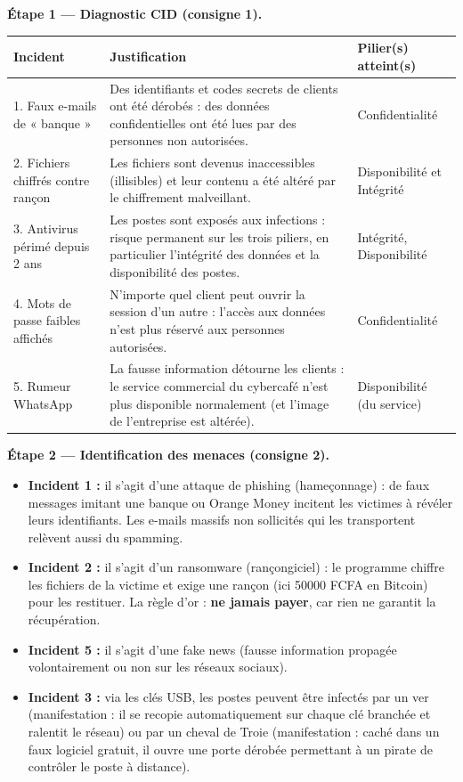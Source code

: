 \documentclass[11pt]{article}
\newcommand{\cle}[1]{{\popxbold\color{popdark}#1}}
\begin{document}
\begin{exoresolu}
\textbf{Étape 1 — Diagnostic CID (consigne 1).}

\begin{center}
\begin{tabularx}{\linewidth}{|l|X|l|}
\hline
\rowcolor{popblueL} \textbf{Incident} & \textbf{Justification} & \textbf{Pilier(s) atteint(s)} \\
\hline
1. Faux e-mails de « banque » & Des identifiants et codes secrets de clients ont été dérobés : des données confidentielles ont été lues par des personnes non autorisées. & Confidentialité \\
\hline
2. Fichiers chiffrés contre rançon & Les fichiers sont devenus inaccessibles (illisibles) et leur contenu a été altéré par le chiffrement malveillant. & Disponibilité et Intégrité \\
\hline
3. Antivirus périmé depuis 2 ans & Les postes sont exposés aux infections : risque permanent sur les trois piliers, en particulier l'intégrité des données et la disponibilité des postes. & Intégrité, Disponibilité \\
\hline
4. Mots de passe faibles affichés & N'importe quel client peut ouvrir la session d'un autre : l'accès aux données n'est plus réservé aux personnes autorisées. & Confidentialité \\
\hline
5. Rumeur WhatsApp & La fausse information détourne les clients : le service commercial du cybercafé n'est plus disponible normalement (et l'image de l'entreprise est altérée). & Disponibilité (du service) \\
\hline
\end{tabularx}
\end{center}

\textbf{Étape 2 — Identification des menaces (consigne 2).}
\begin{itemize}
  \item \textbf{Incident 1 :} il s'agit d'une attaque de \cle{phishing} (hameçonnage) : de faux messages imitant une banque ou Orange Money incitent les victimes à révéler leurs identifiants. Les e-mails massifs non sollicités qui les transportent relèvent aussi du \cle{spamming}.
  \item \textbf{Incident 2 :} il s'agit d'un \cle{ransomware} (rançongiciel) : le programme chiffre les fichiers de la victime et exige une rançon (ici \num{50000} FCFA en Bitcoin) pour les restituer. La règle d'or : \textbf{ne jamais payer}, car rien ne garantit la récupération.
  \item \textbf{Incident 5 :} il s'agit d'une \cle{fake news} (fausse information propagée volontairement ou non sur les réseaux sociaux).
  \item \textbf{Incident 3 :} via les clés USB, les postes peuvent être infectés par un \cle{ver} (manifestation : il se recopie automatiquement sur chaque clé branchée et ralentit le réseau) ou par un \cle{cheval de Troie} (manifestation : caché dans un faux logiciel gratuit, il ouvre une porte dérobée permettant à un pirate de contrôler le poste à distance).
\end{itemize}


\end{exoresolu}
\end{document}
